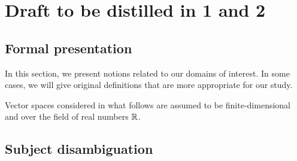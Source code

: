 \setcounter{chapter}{-1}
\chapter{Draft to be distilled in 1 and 2}

\minitoc
\newpage

\section{Formal presentation}

In this section, we present notions related to our domains of interest. In some cases, we will give original definitions that are more appropriate for our study.

Vector spaces considered in what follows are assumed to be finite-dimensional and over the field of real numbers $\mathbb{R}$.


\newpage

\newpage

\newpage

\section{Subject disambiguation}


\newpage